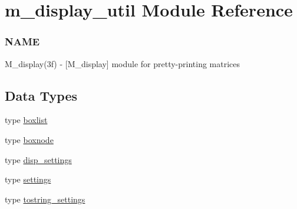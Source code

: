 \hypertarget{namespacem__display__util}{}\section{m\+\_\+display\+\_\+util Module Reference}
\label{namespacem__display__util}


\subsubsection*{N\+A\+ME}

M\+\_\+display(3f) -\/ \mbox{[}M\+\_\+display\mbox{]} module for pretty-\/printing matrices  


\subsection*{Data Types}
\begin{DoxyCompactItemize}
\item 
type \hyperlink{structm__display__util_1_1boxlist}{boxlist}
\item 
type \hyperlink{structm__display__util_1_1boxnode}{boxnode}
\item 
type \hyperlink{structm__display__util_1_1disp__settings}{disp\+\_\+settings}
\item 
type \hyperlink{structm__display__util_1_1settings}{settings}
\item 
type \hyperlink{structm__display__util_1_1tostring__settings}{tostring\+\_\+settings}
\end{DoxyCompactItemize}
